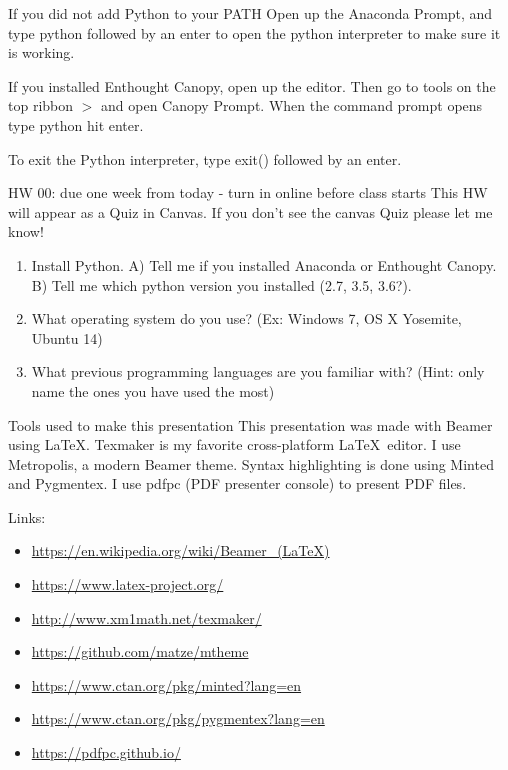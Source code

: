 \documentclass[10pt]{beamer}
\begin{document}
\begin{frame}{If you did not add Python to your PATH}
Open up the Anaconda Prompt, and type python followed by an enter to open the python interpreter to make sure it is working.

If you installed Enthought Canopy, open up the editor. Then go to tools on the top ribbon $>$ and open Canopy Prompt. When the command prompt opens type python hit enter. 

To exit the Python interpreter, type exit() followed by an enter.
\end{frame}

%
%
%

\begin{frame}{HW 00: due one week from today - turn in online before class starts}
This HW will appear as a Quiz in Canvas. If you don't see the canvas Quiz please let me know!
\begin{enumerate}
\item Install Python. A) Tell me if you installed Anaconda or Enthought Canopy. B) Tell me which python version you installed (2.7, 3.5, 3.6?).
\item What operating system do you use? (Ex: Windows 7, OS X Yosemite, Ubuntu 14)
\item What previous programming languages are you familiar with? (Hint: only name the ones you have used the most)
\end{enumerate}
\end{frame}

\begin{frame}{Tools used to make this presentation}
This presentation was made with Beamer using \LaTeX. Texmaker is my favorite cross-platform \LaTeX ~editor. I use Metropolis, a modern Beamer theme. Syntax highlighting is done using Minted and Pygmentex. I use pdfpc (PDF presenter console) to present PDF files. 

Links:
\begin{itemize}
\item \url{https://en.wikipedia.org/wiki/Beamer\_(LaTeX)}
\item \url{https://www.latex-project.org/}
\item \url{http://www.xm1math.net/texmaker/}
\item \url{https://github.com/matze/mtheme}
\item \url{https://www.ctan.org/pkg/minted?lang=en}
\item \url{https://www.ctan.org/pkg/pygmentex?lang=en}
\item \url{https://pdfpc.github.io/}
\end{itemize} 

\end{frame}
\end{document}
